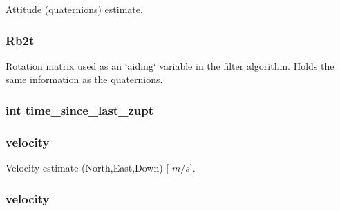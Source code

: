 \-Attitude (quaternions) estimate. 

\hypertarget{group__tables_ga42753cbc9ae76483da3cbc331a011586}{
\subsubsection[{\-Rb2t}]{ {\bf \-Rb2t}}}
\label{group__tables_ga42753cbc9ae76483da3cbc331a011586}


\-Rotation matrix used as an \char`\"{}aiding\char`\"{} variable in the filter algorithm. \-Holds the same information as the quaternions. 

\hypertarget{group__tables_ga20193da701b182264e8b7bf63293c0f9}{
\subsubsection[{time\-\_\-since\-\_\-last\-\_\-zupt}]{\setlength{\rightskip}{0pt plus 5cm}int {\bf time\-\_\-since\-\_\-last\-\_\-zupt}}}
\label{group__tables_ga20193da701b182264e8b7bf63293c0f9}
\hypertarget{group__tables_ga589efe00d8bd4e8a69613f98390a04c7}{
\subsubsection[{velocity}]{ {\bf velocity}}}
\label{group__tables_ga589efe00d8bd4e8a69613f98390a04c7}


\-Velocity estimate (\-North,\-East,\-Down) \mbox{[} $m/s$\mbox{]}. 

\hypertarget{group__tables_ga589efe00d8bd4e8a69613f98390a04c7}{
\subsubsection[{velocity}]{ {\bf velocity}}}
\label{group__tables_ga589efe00d8bd4e8a69613f98390a04c7}


